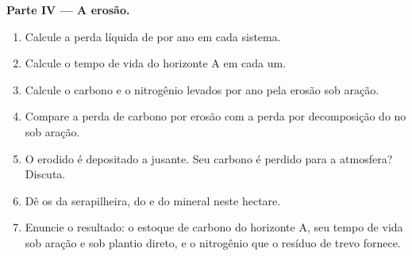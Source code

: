 \begin{problem}
\medskip
\noindent\textbf{Parte IV --- A erosão.}
\begin{enumerate}[resume]
  \item Calcule a perda líquida de  por ano em cada sistema.
  \item Calcule o tempo de vida do horizonte A em cada um.
  \item Calcule o carbono e o nitrogênio levados por ano pela
        erosão sob aração.
  \item Compare a perda de carbono por erosão com a perda por
        decomposição do  no  sob aração.
  \item O  erodido é depositado a jusante. Seu carbono é
        perdido para a atmosfera? Discuta.
  \item Dê os  da serapilheira, do  e do 
        mineral neste hectare.
  \item Enuncie o resultado: o estoque de carbono do horizonte A, seu
        tempo de vida sob aração e sob plantio direto, e o
        nitrogênio que o resíduo de trevo fornece.
\end{enumerate}
\end{problem}
